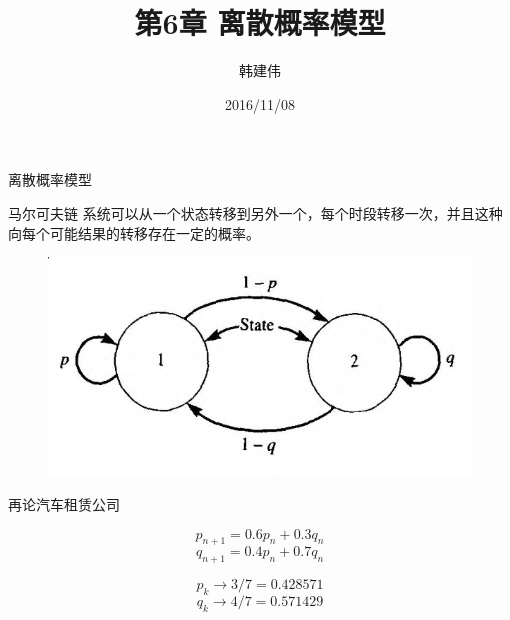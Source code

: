 \documentclass[mathserif, table]{beamer}
\title{第6章 离散概率模型}
\author{韩建伟}
\institute{
  信息学院\\
  \texttt{mm@hanjianwei.com}
}
\date{2016/11/08}
\begin{document}
\begin{frame}[plain]
  \titlepage{}
\end{frame}

\begin{frame}{离散概率模型}

  \begin{block}{马尔可夫链}
    系统可以从一个状态转移到另外一个，每个时段转移一次，并且这种向每个可能结果的转移存在一定的概率。
  \end{block}

  \begin{figure}
    \centering
    \includegraphics[width=0.6\textwidth{}]{markov.png}
  \end{figure}

\end{frame}

\begin{frame}{再论汽车租赁公司}
  \begin{figure}
    \centering
  \end{figure}

  \[
  p_{n+1} = 0.6p_n + 0.3q_n
  \]
  \[
  q_{n+1} = 0.4p_n + 0.7q_n
  \]

  \[
  p_k \rightarrow 3/7 = 0.428571
  \]
  \[
  q_k \rightarrow 4/7 = 0.571429
  \]
\end{frame}
\end{document}
